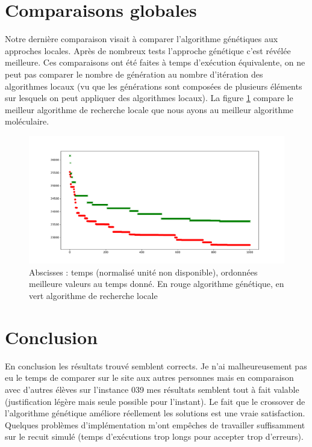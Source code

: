 \documentclass[10pt,a4paper]{article}
\begin{document}
\section{Comparaisons globales}

Notre dernière comparaison visait à comparer l'algorithme génétiques aux approches locales. Après de nombreux tests l'approche génétique c'est révélée meilleure. Ces comparaisons ont été faites à temps d’exécution équivalente, on ne peut pas comparer le nombre de génération au nombre d'itération des algorithmes locaux (vu que les générations sont composées de plusieurs éléments sur lesquels on peut appliquer des algorithmes locaux). La figure \ref{comparegeneral} compare le meilleur algorithme de recherche locale que nous ayons au meilleur algorithme moléculaire. 


\begin{figure}
\centering
\includegraphics[scale=.4]{images/comparaison_genetic_without_error.pdf}
\caption{Abscisses : temps (normalisé unité non disponible), ordonnées meilleure valeurs au temps donné. En rouge algorithme génétique, en vert algorithme de recherche locale}
\label{comparegeneral}
\end{figure}


\section{Conclusion}

En conclusion les résultats trouvé semblent corrects. Je n'ai malheureusement pas eu le temps de comparer sur le site aux autres personnes mais en comparaison avec d'autres élèves sur l'instance 039 mes résultats semblent tout à fait valable (justification légère mais seule possible pour l'instant). Le fait que le crossover de l'algorithme génétique améliore réellement les solutions est une vraie satisfaction.
 Quelques problèmes d'implémentation m'ont empêches de travailler suffisamment sur le recuit simulé (temps d’exécutions trop longs pour accepter trop d'erreurs).
 
 
\end{document}
